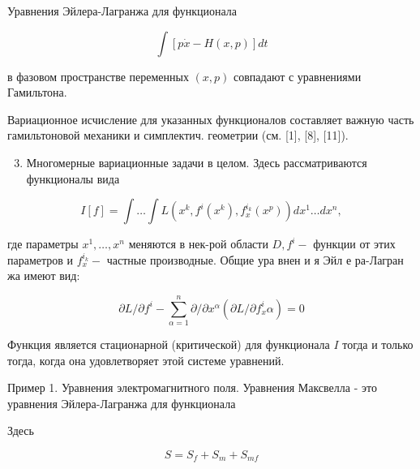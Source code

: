 \documentclass[10pt]{article}
\begin{document}
Уравнения Эйлера-Лагранжа для функционала



\[

\int[p \dot{x}-H(x, p)] d t

\]



в фазовом пространстве переменных $(x, p)$ совпадают с уравнениями Гамильтона.



Вариационное исчисление для указанных функционалов составляет важную часть гамильтоновой механики и симплектич. геометрии (см. [1], [8], [11]).



\begin{enumerate}

  \setcounter{enumi}{2}

  \item Многомерные вариационные задачи в целом. Здесь рассматриваются функционалы вида

\end{enumerate}



\[

I[f]=\int \ldots \int L\left(x^{k}, f^{i}\left(x^{k}\right), f_{x}^{i_{k}}\left(x^{p}\right)\right) d x^{1} \ldots d x^{n},

\]



где параметры $x^{1}, \ldots, x^{n}$ меняются в нек-рой области $D, f^{i}-$ функции от этих параметров и $f_{x}^{i_{k}}-$ частные производные. Общие ура внен и я Эйл е ра-Лагран жа имеют вид:



\[

\partial L / \partial f^{i}-\sum_{\alpha=1}^{n} \partial / \partial x^{\alpha}\left(\partial L / \partial f_{x}^{i} \alpha\right)=0

\]



Функция является стационарной (критической) для функционала $I$ тогда и только тогда, когда она удовлетворяет этой системе уравнений.



Пример 1. Уравнения электромагнитного поля. Уравнения Максвелла - это уравнения Эйлера-Лагранжа для функционала



Здесь



\[

S=S_{f}+S_{m}+S_{m f}

\]
\end{document}
